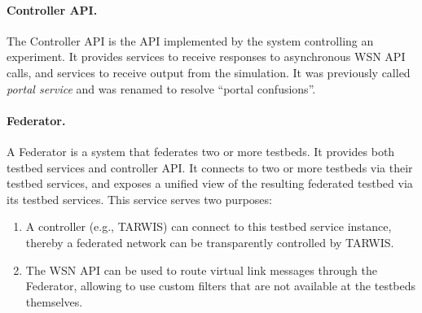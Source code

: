 \paragraph{Controller API.}
The Controller API is the API implemented by the system controlling an experiment. It provides services to receive responses to asynchronous WSN API calls, and services to receive output from the simulation. It was previously called {\em portal service} and was renamed to resolve ``portal confusions''.

\paragraph{Federator.}
A Federator is a system that federates two or more testbeds. It provides both testbed services and controller API. It connects to two or more testbeds via their testbed services, and exposes a unified view of the resulting federated testbed via its testbed services. This service serves two purposes:
\begin{enumerate}
	\item A controller (e.g., TARWIS) can connect to this testbed service instance, thereby a federated network can be transparently controlled by TARWIS.
	\item The WSN API can be used to route virtual link messages through the Federator, allowing to use custom filters that are not available at the testbeds themselves.
\end{enumerate}


